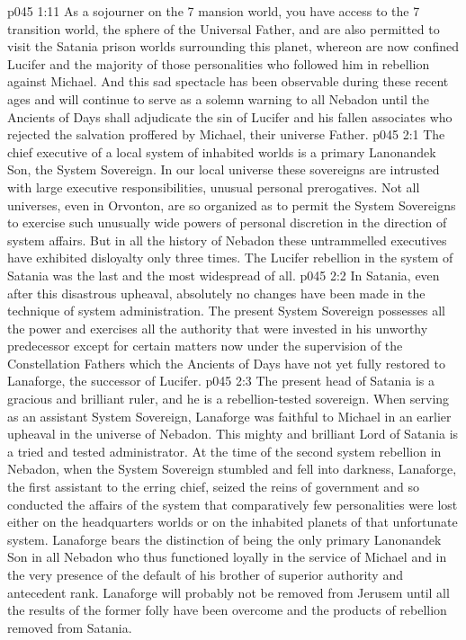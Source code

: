 \vs p045 1:11 As a sojourner on the 7 mansion world, you have access to the 7 transition world, the sphere of the Universal Father, and are also permitted to visit the Satania prison worlds surrounding this planet, whereon are now confined Lucifer and the majority of those personalities who followed him in rebellion against Michael. And this sad spectacle has been observable during these recent ages and will continue to serve as a solemn warning to all Nebadon until the Ancients of Days shall adjudicate the sin of Lucifer and his fallen associates who rejected the salvation proffered by Michael, their universe Father.
\vs p045 2:1 The chief executive of a local system of inhabited worlds is a primary Lanonandek Son, the System Sovereign. In our local universe these sovereigns are intrusted with large executive responsibilities, unusual personal prerogatives. Not all universes, even in Orvonton, are so organized as to permit the System Sovereigns to exercise such unusually wide powers of personal discretion in the direction of system affairs. But in all the history of Nebadon these untrammelled executives have exhibited disloyalty only three times. The Lucifer rebellion in the system of Satania was the last and the most widespread of all.
\vs p045 2:2 In Satania, even after this disastrous upheaval, absolutely no changes have been made in the technique of system administration. The present System Sovereign possesses all the power and exercises all the authority that were invested in his unworthy predecessor except for certain matters now under the supervision of the Constellation Fathers which the Ancients of Days have not yet fully restored to Lanaforge, the successor of Lucifer.
\vs p045 2:3 \pc The present head of Satania is a gracious and brilliant ruler, and he is a rebellion\hyp{}tested sovereign. When serving as an assistant System Sovereign, Lanaforge was faithful to Michael in an earlier upheaval in the universe of Nebadon. This mighty and brilliant Lord of Satania is a tried and tested administrator. At the time of the second system rebellion in Nebadon, when the System Sovereign stumbled and fell into darkness, Lanaforge, the first assistant to the erring chief, seized the reins of government and so conducted the affairs of the system that comparatively few personalities were lost either on the headquarters worlds or on the inhabited planets of that unfortunate system. Lanaforge bears the distinction of being the only primary Lanonandek Son in all Nebadon who thus functioned loyally in the service of Michael and in the very presence of the default of his brother of superior authority and antecedent rank. Lanaforge will probably not be removed from Jerusem until all the results of the former folly have been overcome and the products of rebellion removed from Satania.
